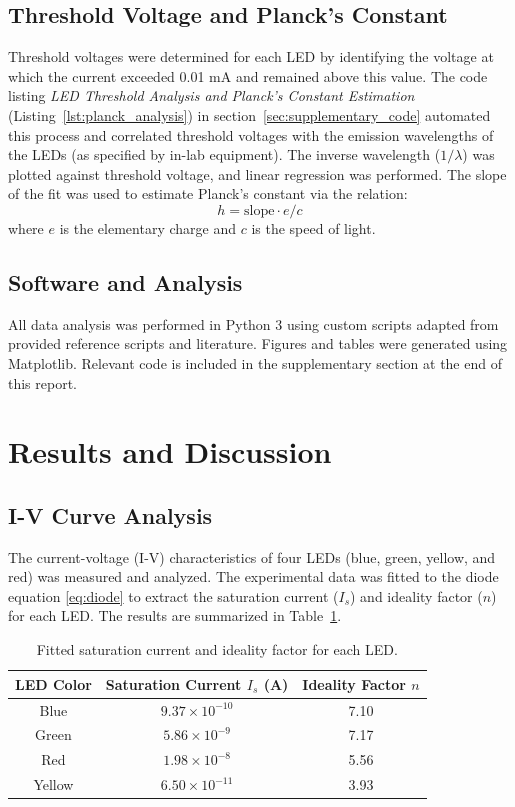 \documentclass[12pt,a4paper]{article}
\begin{document}
\subsection{Threshold Voltage and Planck’s Constant}
Threshold voltages were determined for each LED by identifying the voltage at which the current exceeded 0.01 mA and remained above this value. The code listing \textit{LED Threshold Analysis and Planck’s Constant Estimation} (Listing~\ref{lst:planck_analysis}) in section~\ref{sec:supplementary_code} automated this process and correlated threshold voltages with the emission wavelengths of the LEDs (as specified by in-lab equipment). The inverse wavelength ($1/\lambda$) was plotted against threshold voltage, and linear regression was performed. The slope of the fit was used to estimate Planck’s constant via the relation:
\begin{equation}
h = \text{slope} \cdot e / c
\label{eq:planck}
\end{equation}
where $e$ is the elementary charge and $c$ is the speed of light.

\subsection{Software and Analysis}
All data analysis was performed in Python 3 using custom scripts adapted from provided reference scripts and literature. Figures and tables were generated using Matplotlib. Relevant code is included in the supplementary section at the end of this report.

\section{Results and Discussion}

\subsection{I-V Curve Analysis}

The current-voltage (I-V) characteristics of four LEDs (blue, green, yellow, and red) was measured and analyzed. The experimental data was fitted to the diode equation \eqref{eq:diode} to extract the saturation current ($I_s$) and ideality factor ($n$) for each LED. The results are summarized in Table~\ref{tab:ivparams}.

\begin{table}[h]
\centering
\begin{tabular}{|c|c|c|}
\hline
LED Color & Saturation Current $I_s$ (A) & Ideality Factor $n$ \\
\hline
Blue    & $9.37 \times 10^{-10}$ & 7.10 \\
Green   & $5.86 \times 10^{-9}$  & 7.17 \\
Red     & $1.98 \times 10^{-8}$  & 5.56 \\
Yellow  & $6.50 \times 10^{-11}$ & 3.93 \\
\hline
\end{tabular}
\caption{Fitted saturation current and ideality factor for each LED.}
\label{tab:ivparams}
\end{table}
\end{document}
